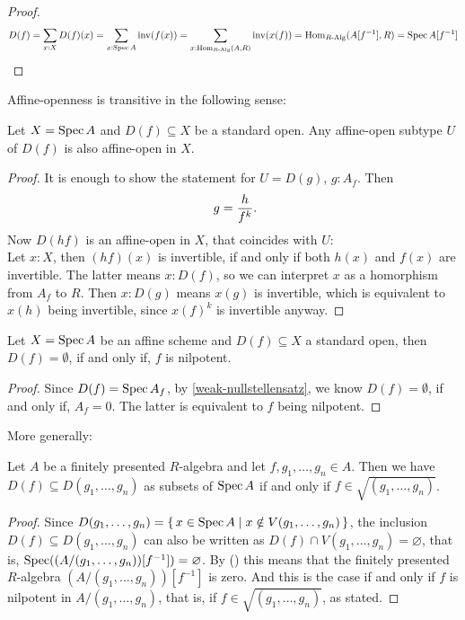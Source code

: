 \begin{proof}
  \[ D(f) =
     \sum_{x : X} D(f)(x) =
     \sum_{x : \operatorname{Spec} A} \mathrm{inv}(f(x)) =
     \sum_{x : \mathrm{Hom}_{R\text{-}\mathrm{Alg}}(A, R)} \mathrm{inv}(x(f)) =
     \mathrm{Hom}_{R\text{-}\mathrm{Alg}}(A[f^{-1}], R) =
     \operatorname{Spec} A[f^{-1}]
     \]
\end{proof}

Affine-openness is transitive in the following sense:

\begin{lemma}%
  \label{affine-open-trans}
  Let $X=\operatorname{Spec} A$ and $D(f)\subseteq X$ be a standard open.
  Any affine-open subtype $U$ of $D(f)$ is also affine-open in $X$.
\end{lemma}

\begin{proof}
  It is enough to show the statement for $U=D(g)$, $g:A_f$.
  Then
  \[ g=\frac{h}{f^k}\rlap{.}\]
  Now $D(hf)$ is an affine-open in $X$,
  that coincides with $U$: \\
  Let $x:X$, then $(hf)(x)$ is invertible, if and only if both $h(x)$ and $f(x)$ are invertible.
  The latter means $x:D(f)$, so we can interpret $x$ as a homorphism from $A_f$ to $R$.
  Then $x:D(g)$ means $x(g)$ is invertible, which is equivalent to $x(h)$ being invertible,
  since $x(f)^k$ is invertible anyway.
\end{proof}

\begin{lemma}%
  \label{standard-open-empty}
  Let $X=\operatorname{Spec} A$ be an affine scheme and $D(f)\subseteq X$ a standard open,
  then $D(f)=\emptyset$, if and only if, $f$ is nilpotent.
\end{lemma}

\begin{proof}
  Since $D(f)=\operatorname{Spec} A_f$, by \cref{weak-nullstellensatz}, we know $D(f)=\emptyset$,
  if and only if, $A_f=0$.
  The latter is equivalent to $f$ being nilpotent.
\end{proof}

More generally:

\begin{lemma}%
  Let $A$ be a finitely presented $R$-algebra
  and let $f, g_1, \dots, g_n \in A$.
  Then we have $D(f) \subseteq D(g_1, \dots, g_n)$
  as subsets of $\operatorname{Spec} A$
  if and only if $f \in \sqrt{(g_1, \dots, g_n)}$.
\end{lemma}

\begin{proof}
  Since $D(g_1, \dots, g_n) = \{\, x \in \operatorname{Spec} A \mid x \notin V(g_1, \dots, g_n) \,\}$,
  the inclusion $D(f) \subseteq D(g_1, \dots, g_n)$
  can also be written as
  $D(f) \cap V(g_1, \dots, g_n) = \varnothing$, that is,
  $\operatorname{Spec}((A/(g_1, \dots, g_n))[f^{-1}]) = \varnothing$.
  By ()
  this means that the finitely presented $R$-algebra $(A/(g_1, \dots, g_n))[f^{-1}]$
  is zero.
  And this is the case if and only if $f$ is nilpotent in $A/(g_1, \dots, g_n)$,
  that is, if $f \in \sqrt{(g_1, \dots, g_n)}$, as stated.
\end{proof}

